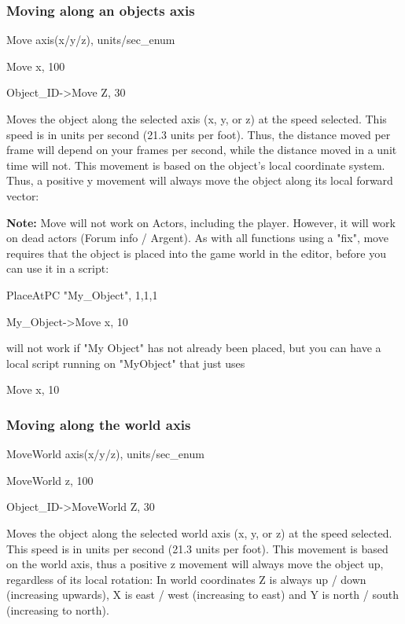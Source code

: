 \documentclass[
]{article}
\begin{document}
\hypertarget{moving-along-an-objects-axis}{%
\subsubsection{Moving along an objects
axis}\label{moving-along-an-objects-axis}}

Move axis(x/y/z), units/sec\_enum

Move x, 100

Object\_ID-\textgreater Move Z, 30

Moves the object along the selected axis (x, y, or z) at the speed
selected. This speed is in units per second (21.3 units per foot). Thus,
the distance moved per frame will depend on your frames per second,
while the distance moved in a unit time will not. This movement is based
on the object's local coordinate system. Thus, a positive y movement
will always move the object along its local forward vector:

\textbf{Note:} Move will not work on Actors, including the player.
However, it will work on dead actors (Forum info / Argent). As with all
functions using a "fix", move requires that the object is placed into
the game world in the editor, before you can use it in a script:

PlaceAtPC "My\_Object", 1,1,1

My\_Object-\textgreater Move x, 10

will not work if "My Object" has not already been placed, but you can
have a local script running on "MyObject" that just uses

Move x, 10

\hypertarget{moving-along-the-world-axis}{%
\subsubsection{Moving along the world
axis}\label{moving-along-the-world-axis}}

MoveWorld axis(x/y/z), units/sec\_enum

MoveWorld z, 100

Object\_ID-\textgreater MoveWorld Z, 30

Moves the object along the selected world axis (x, y, or z) at the speed
selected. This speed is in units per second (21.3 units per foot). This
movement is based on the world axis, thus a positive z movement will
always move the object up, regardless of its local rotation: In world
coordinates Z is always up / down (increasing upwards), X is east / west
(increasing to east) and Y is north / south (increasing to north).
\end{document}
